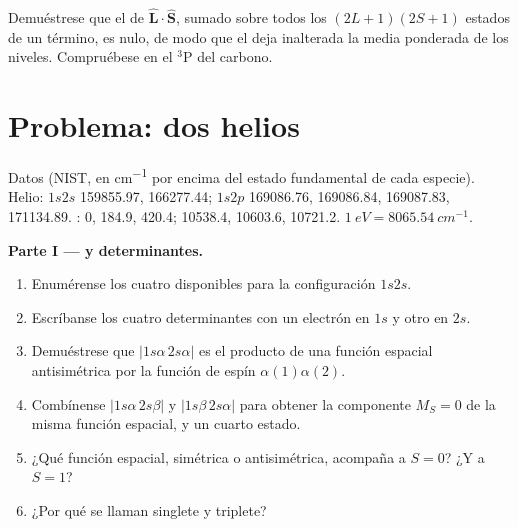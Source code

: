 \begin{exercise}[$\star\star\star$]\label{exo:b3:many-electron-atoms:12}
Demuéstrese que el  de $\hat{\mathbf L}\cdot\hat{\mathbf S}$, sumado
sobre todos los $(2L+1)(2S+1)$ estados de un término, es nulo, de modo que el  deja inalterada la media ponderada de los niveles. Compruébese en el
${}^3$P del carbono.
\end{exercise}

\section{Problema: dos helios}

\begin{problem}
\label{pb:b3:many-electron-atoms:1}
Datos (NIST, en \unit{cm^{-1}} por encima del estado fundamental de cada especie). Helio:
$1s2s$  159855.97,  166277.44; $1s2p$
 169086.76, 169086.84, 169087.83, 
171134.89. :  0, 184.9, 420.4; 
10538.4, 10603.6, 10721.2. $\qty{1}{eV} = \qty{8065.54}{cm^{-1}}$.

\medskip\noindent\textbf{Parte I ---  y determinantes.}
\begin{enumerate}
  \item Enumérense los cuatro  disponibles para la configuración $1s2s$.
  \item Escríbanse los cuatro determinantes con un electrón en $1s$ y otro en
        $2s$.
  \item Demuéstrese que $|1s\alpha\,2s\alpha|$ es el producto de una función espacial
        antisimétrica por la función de espín $\alpha(1)\alpha(2)$.
  \item Combínense $|1s\alpha\,2s\beta|$ y $|1s\beta\,2s\alpha|$ para obtener la
        componente $M_S = 0$ de la misma función espacial, y un cuarto estado.
  \item ¿Qué función espacial, simétrica o antisimétrica, acompaña a
        $S = 0$? ¿Y a $S = 1$?
  \item ¿Por qué se llaman singlete y triplete?
\end{enumerate}


\end{problem}
